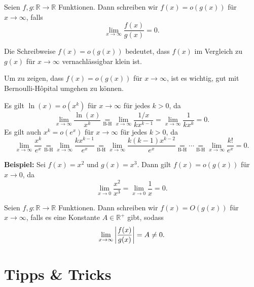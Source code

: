 \documentclass[12pt]{article}
\newcommand{\BH}{\underset{\textrm{B-H}}{=}}
\newcommand{\R}{\mathbb{R}} %
\newenvironment{definition}[2][Definition]{\begin{trivlist}
        \item[\hskip \labelsep {\bfseries #1}\hskip \labelsep {\bfseries #2.}]}{\flushright{$\square$}\end{trivlist}}
\newenvironment{remark}[2][Bemerkung]{\begin{trivlist}
        \item[\hskip \labelsep {\bfseries #1}\hskip \labelsep {\bfseries #2.}]}{\end{trivlist}}
\begin{document}
\begin{definition}{[Landau-o]}
        Seien $f,g: \R\to\R$ Funktionen. Dann schreiben wir $f(x)=o(g(x))$ für $x\to \infty$, falls
        \begin{equation}
                \lim_{x\to \infty}\frac{f(x)}{g(x)}=0.
        \end{equation}

        \begin{remark}{[Intuition]}
                Die Schreibweise $f(x)=o(g(x))$ bedeutet, dass $f(x)$ im Vergleich zu $g(x)$ für $x\to \infty$ vernachlässigbar klein ist.
        \end{remark}
        \begin{remark}{[Berechnung]}
                Um zu zeigen, dass $f(x)=o(g(x))$ für $x\to \infty$, ist es wichtig, gut mit Bernoulli-Hôpital umgehen zu können.
        \end{remark}
        \begin{remark}{[$\ln$, $x^k$ und $e^x$]}
                Es gilt $\ln(x)=o(x^k)$ für $x\to\infty$ für jedes $k>0$, da
                \begin{equation}
                        \lim_{x\to\infty}\frac{\ln(x)}{x^k}\BH{}\lim_{x\to\infty}\frac{1/x}{kx^{k-1}}=\lim_{x\to\infty}\frac{1}{kx^k}=0.
                \end{equation}
                Es gilt auch $x^k=o(e^x)$ für $x\to\infty$ für jedes $k>0$, da
                \begin{equation}
                        \lim_{x\to\infty}\frac{x^k}{e^x}\BH{}\lim_{x\to\infty}\frac{kx^{k-1}}{e^x}\BH\lim_{x\to\infty}\frac{k(k-1)x^{k-2}}{e^x}\BH\cdots\BH\lim_{x\to\infty}\frac{k!}{e^x}=0.
                \end{equation}
        \end{remark}
        \textbf{Beispiel:} Sei $f(x)=x^2$ und $g(x)=x^3$. Dann gilt $f(x)=o(g(x))$ für $x\to 0$, da
        \begin{equation}
                \lim_{x\to 0}\frac{x^2}{x^3}=\lim_{x\to 0}\frac{1}{x}=0.
        \end{equation}
\end{definition}

\begin{definition}{[Landau-O]}
        Seien $f,g: \R\to\R$ Funktionen. Dann schreiben wir $f(x)=O(g(x))$ für $x\to \infty$, falls es eine Konstante $A\in\R^{+}$ gibt, sodass
        \begin{equation}
                \lim_{x\to \infty}\abs{\frac{f(x)}{g(x)}}=A\neq0.
        \end{equation}
\end{definition}

\section{Tipps \& Tricks}
\end{document}
